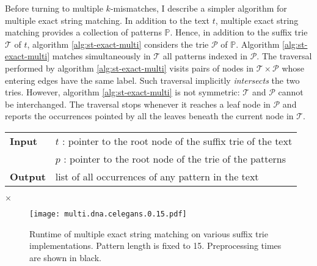 Before turning to multiple $k$-mismatches, I describe a simpler algorithm for multiple exact string matching.
In addition to the text $t$, multiple exact string matching provides a collection of patterns $\mathbb{P}$.
Hence, in addition to the suffix trie $\mathcal{T}$ of $t$, algorithm \ref{alg:st-exact-multi} considers the trie $\mathcal{P}$ of $\mathbb{P}$.
Algorithm \ref{alg:st-exact-multi} matches simultaneously in $\mathcal{T}$ all patterns indexed in $\mathcal{P}$.
The traversal performed by algorithm \ref{alg:st-exact-multi} visits pairs of nodes in $\mathcal{T} \times \mathcal{P}$ whose entering edges have the same label.
Such traversal implicitly \emph{intersects} the two tries.
However, algorithm \ref{alg:st-exact-multi} is not symmetric: $\mathcal{T}$ and $\mathcal{P}$ cannot be interchanged.
The traversal stops whenever it reaches a leaf node in $\mathcal{P}$ and reports the occurrences pointed by all the leaves beneath the current node in $\mathcal{T}$.

\begin{figure*}[t]
\begin{center}
\begin{minipage}[t]{.8\textwidth}
\begin{algorithm}[H]
\begin{tabular}{ll}
\textbf{Input}  & $t$ : pointer to the root node of the suffix trie of the text\\
 			    & $p$ : pointer to the root node of the trie of the patterns\\
\textbf{Output} & list of all occurrences of any pattern in the text\\
\end{tabular}
\begin{algorithmic}[1]
	\State \Report {} $\times$ 
\Else
	\State {}
	\Repeat
			\State {}
			\State {}
		\EndIf
\EndIf
\end{algorithmic}
\label{alg:st-exact-multi}
\end{algorithm}
\end{minipage}
\end{center}
\end{figure*}

\begin{figure}[b]
\begin{center}
\caption[Multiple exact string matching runtime]{Runtime of multiple exact string matching on various suffix trie implementations. Pattern length is fixed to 15. Preprocessing times are shown in black.}
\label{fig:query-dna-exact-multi}
\texttt{[image: multi.dna.celegans.0.15.pdf]}
\end{center}
\end{figure}

